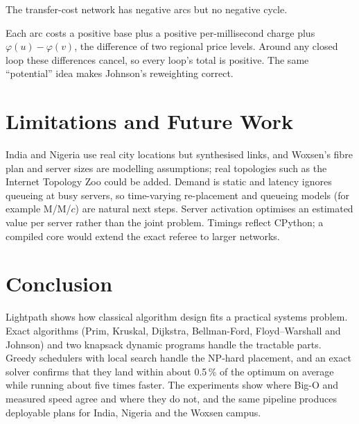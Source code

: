 \begin{lemma}\label{lem:nocycle}
The transfer-cost network has negative arcs but no negative cycle.
\end{lemma}
\begin{proofsketch}
Each arc costs a positive base plus a positive per-millisecond charge plus $\varphi(u)-\varphi(v)$, the difference of two regional price levels. Around any closed loop these differences cancel, so every loop's total is positive. The same ``potential'' idea makes Johnson's reweighting correct.
\end{proofsketch}

\section{Limitations and Future Work}
India and Nigeria use real city locations but synthesised links, and Woxsen's fibre plan and server sizes are modelling assumptions; real topologies such as the Internet Topology Zoo could be added. Demand is static and latency ignores queueing at busy servers, so time-varying re-placement and queueing models (for example M/M/$c$) are natural next steps. Server activation optimises an estimated value per server rather than the joint problem. Timings reflect CPython; a compiled core would extend the exact referee to larger networks.

\section{Conclusion}
Lightpath shows how classical algorithm design fits a practical systems problem. Exact algorithms (Prim, Kruskal, Dijkstra, Bellman-Ford, Floyd--Warshall and Johnson) and two knapsack dynamic programs handle the tractable parts. Greedy schedulers with local search handle the NP-hard placement, and an exact solver confirms that they land within about 0.5\,\% of the optimum on average while running about five times faster. The experiments show where Big-O and measured speed agree and where they do not, and the same pipeline produces deployable plans for India, Nigeria and the Woxsen campus.

